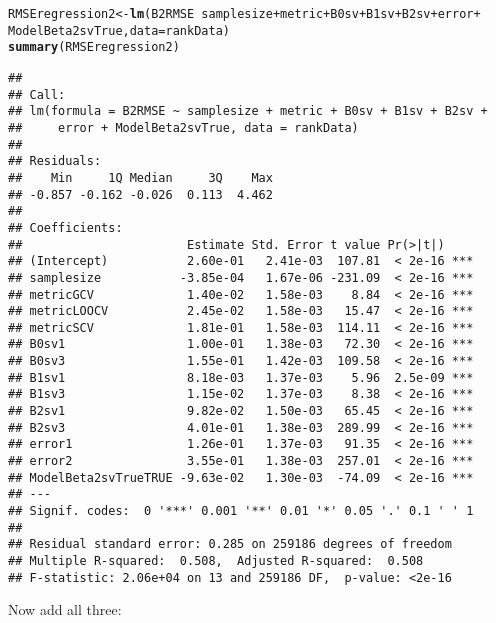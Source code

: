 \documentclass{article}\usepackage[]{graphicx}\usepackage[]{color}
\makeatletter
\newcommand{\hlopt}[1]{\textcolor[rgb]{0,0,0}{#1}}%
\newcommand{\hlstd}[1]{\textcolor[rgb]{0.345,0.345,0.345}{#1}}%
\newcommand{\hlkwb}[1]{\textcolor[rgb]{0.69,0.353,0.396}{#1}}%
\newcommand{\hlkwc}[1]{\textcolor[rgb]{0.333,0.667,0.333}{#1}}%
\newcommand{\hlkwd}[1]{\textcolor[rgb]{0.737,0.353,0.396}{\textbf{#1}}}%
\newenvironment{kframe}{%
 \def\at@end@of@kframe{}%
 \ifinner\ifhmode%
  \def\at@end@of@kframe{\end{minipage}}%
  \begin{minipage}{\columnwidth}%
 \fi\fi%
 \def\FrameCommand##1{\hskip\@totalleftmargin \hskip-\fboxsep
 \colorbox{shadecolor}{##1}\hskip-\fboxsep
     \hskip-\linewidth \hskip-\@totalleftmargin \hskip\columnwidth}%
 \MakeFramed {\advance\hsize-\width
   \@totalleftmargin\z@ \linewidth\hsize
   \@setminipage}}%
 {\par\unskip\endMakeFramed%
 \at@end@of@kframe}
\newenvironment{knitrout}{}{} %
\makeatother
\begin{document}
\begin{knitrout}
\color{fgcolor}\begin{kframe}
\begin{alltt}
\hlstd{RMSEregression2} \hlkwb{<-} \hlkwd{lm}\hlstd{(B2RMSE} \hlopt{~} \hlstd{samplesize} \hlopt{+} \hlstd{metric} \hlopt{+} \hlstd{B0sv} \hlopt{+} \hlstd{B1sv} \hlopt{+} \hlstd{B2sv} \hlopt{+} \hlstd{error} \hlopt{+}
    \hlstd{ModelBeta2svTrue,} \hlkwc{data} \hlstd{= rankData)}
\hlkwd{summary}\hlstd{(RMSEregression2)}
\end{alltt}
\begin{verbatim}
## 
## Call:
## lm(formula = B2RMSE ~ samplesize + metric + B0sv + B1sv + B2sv + 
##     error + ModelBeta2svTrue, data = rankData)
## 
## Residuals:
##    Min     1Q Median     3Q    Max 
## -0.857 -0.162 -0.026  0.113  4.462 
## 
## Coefficients:
##                       Estimate Std. Error t value Pr(>|t|)    
## (Intercept)           2.60e-01   2.41e-03  107.81  < 2e-16 ***
## samplesize           -3.85e-04   1.67e-06 -231.09  < 2e-16 ***
## metricGCV             1.40e-02   1.58e-03    8.84  < 2e-16 ***
## metricLOOCV           2.45e-02   1.58e-03   15.47  < 2e-16 ***
## metricSCV             1.81e-01   1.58e-03  114.11  < 2e-16 ***
## B0sv1                 1.00e-01   1.38e-03   72.30  < 2e-16 ***
## B0sv3                 1.55e-01   1.42e-03  109.58  < 2e-16 ***
## B1sv1                 8.18e-03   1.37e-03    5.96  2.5e-09 ***
## B1sv3                 1.15e-02   1.37e-03    8.38  < 2e-16 ***
## B2sv1                 9.82e-02   1.50e-03   65.45  < 2e-16 ***
## B2sv3                 4.01e-01   1.38e-03  289.99  < 2e-16 ***
## error1                1.26e-01   1.37e-03   91.35  < 2e-16 ***
## error2                3.55e-01   1.38e-03  257.01  < 2e-16 ***
## ModelBeta2svTrueTRUE -9.63e-02   1.30e-03  -74.09  < 2e-16 ***
## ---
## Signif. codes:  0 '***' 0.001 '**' 0.01 '*' 0.05 '.' 0.1 ' ' 1
## 
## Residual standard error: 0.285 on 259186 degrees of freedom
## Multiple R-squared:  0.508,	Adjusted R-squared:  0.508 
## F-statistic: 2.06e+04 on 13 and 259186 DF,  p-value: <2e-16
\end{verbatim}
\end{kframe}
\end{knitrout}


Now add all three:
\end{document}
